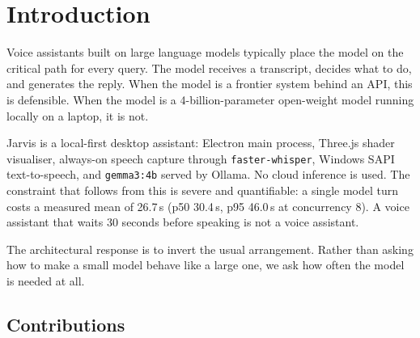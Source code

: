 \documentclass[10pt,twocolumn]{article}
\newcommand{\code}[1]{\texttt{\small #1}}
\begin{document}
\section{Introduction}

Voice assistants built on large language models typically place the model on the
critical path for every query. The model receives a transcript, decides what to do, and
generates the reply. When the model is a frontier system behind an API, this is
defensible. When the model is a 4-billion-parameter open-weight model running locally on
a laptop, it is not.

Jarvis is a local-first desktop assistant: Electron main process, Three.js shader
visualiser, always-on speech capture through \code{faster-whisper}, Windows SAPI
text-to-speech, and \code{gemma3:4b} served by Ollama. No cloud inference is used. The
constraint that follows from this is severe and quantifiable: a single model turn costs
a measured mean of 26.7\,s (p50 30.4\,s, p95 46.0\,s at concurrency 8). A voice
assistant that waits 30 seconds before speaking is not a voice assistant.

The architectural response is to invert the usual arrangement. Rather than asking how to
make a small model behave like a large one, we ask how often the model is needed at all.

\subsection{Contributions}
\end{document}
